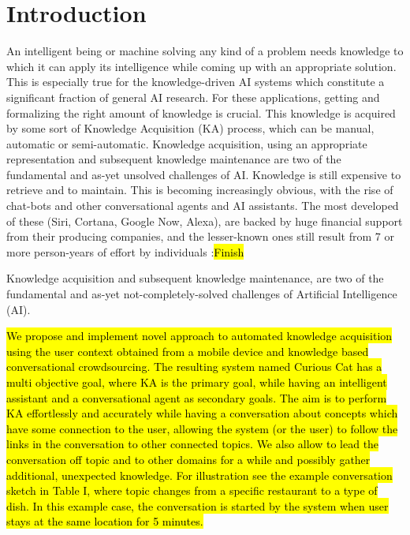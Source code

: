 % 
\chapter{Introduction}
An intelligent being or machine solving any kind of a problem needs knowledge to which it can apply its intelligence while coming up with an appropriate solution. This is especially true for the knowledge-driven AI systems which constitute a significant fraction of general AI research. For these applications, getting and formalizing the right amount of knowledge is crucial. This knowledge is acquired by some sort of Knowledge Acquisition (KA) process, which can be manual, automatic or semi-automatic. Knowledge acquisition, using an appropriate representation and subsequent knowledge maintenance are two of the fundamental and as-yet unsolved challenges of AI. Knowledge is still expensive to retrieve and to maintain. This is becoming increasingly obvious, with the rise of chat-bots and other conversational agents and AI assistants. The most developed of these (Siri, Cortana, Google Now, Alexa), are backed by huge financial support from their producing companies, and the lesser-known ones still result from 7 or more person-years of effort by individuals
\todo:{\hl{Finish}}

Knowledge acquisition and subsequent knowledge maintenance, are two of the fundamental and as-yet not-completely-solved challenges of Artificial Intelligence (AI).

\hl{We propose and implement novel approach to automated knowledge acquisition using the user context obtained from a mobile device and knowledge based conversational crowdsourcing. The resulting system named Curious Cat has a multi objective goal, where KA is the primary goal, while having an intelligent assistant and a conversational agent as secondary goals. The aim is to perform KA effortlessly and accurately while having a conversation about concepts which have some connection to the user, allowing the system (or the user) to follow the links in the conversation to other connected topics. We also allow to lead the conversation off topic and to other domains for a while and possibly gather additional, unexpected knowledge. For illustration see the example conversation sketch in Table I, where topic changes from a specific restaurant to a type of dish. In this example case, the conversation is started by the system when user stays at the same location for 5 minutes.}

